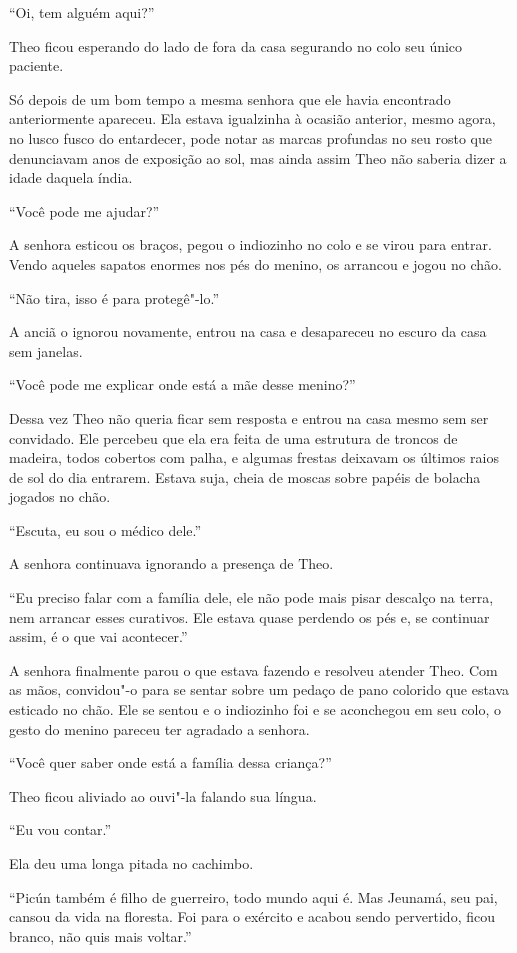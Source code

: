 ``Oi, tem alguém aqui?''

Theo ficou esperando do lado de fora da casa segurando no colo seu único
paciente.

Só depois de um bom tempo a mesma senhora que ele havia encontrado
anteriormente apareceu. Ela estava igualzinha à ocasião anterior, mesmo
agora, no lusco fusco do entardecer, pode notar as marcas profundas no
seu rosto que denunciavam anos de exposição ao sol, mas ainda assim Theo
não saberia dizer a idade daquela índia.

``Você pode me ajudar?''

A senhora esticou os braços, pegou o indiozinho no colo e se virou para
entrar. Vendo aqueles sapatos enormes nos pés do menino, os arrancou e
jogou no chão.

``Não tira, isso é para protegê"-lo.''

A anciã o ignorou novamente, entrou na casa e desapareceu no escuro da
casa sem janelas.

``Você pode me explicar onde está a mãe desse menino?''

Dessa vez Theo não queria ficar sem resposta e entrou na casa mesmo sem
ser convidado. Ele percebeu que ela era feita de uma estrutura de
troncos de madeira, todos cobertos com palha, e algumas frestas deixavam
os últimos raios de sol do dia entrarem. Estava suja, cheia de moscas
sobre papéis de bolacha jogados no chão.

``Escuta, eu sou o médico dele.''

A senhora continuava ignorando a presença de Theo.

``Eu preciso falar com a família dele, ele não pode mais pisar descalço
na terra, nem arrancar esses curativos. Ele estava quase perdendo os pés
e, se continuar assim, é o que vai acontecer.''

A senhora finalmente parou o que estava fazendo e resolveu atender Theo.
Com as mãos, convidou"-o para se sentar sobre um pedaço de pano colorido
que estava esticado no chão. Ele se sentou e o indiozinho foi e se
aconchegou em seu colo, o gesto do menino pareceu ter agradado a
senhora.

``Você quer saber onde está a família dessa criança?''

Theo ficou aliviado ao ouvi"-la falando sua língua.

``Eu vou contar.''

Ela deu uma longa pitada no cachimbo.

``Picún também é filho de guerreiro, todo mundo aqui é. Mas Jeunamá, seu
pai, cansou da vida na floresta. Foi para o exército e acabou sendo
pervertido, ficou branco, não quis mais voltar.''


